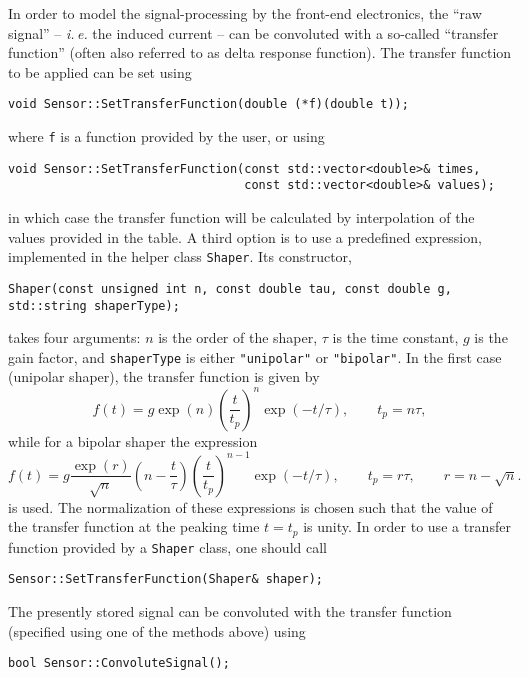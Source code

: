In order to model the signal-processing by the front-end electronics, the 
``raw signal'' -- \textit{i.\,e.} the induced current -- 
can be convoluted with a so-called ``transfer function'' (often also referred 
to as delta response function). 
The transfer function to be applied can be set using
\begin{lstlisting}
void Sensor::SetTransferFunction(double (*f)(double t));
\end{lstlisting}
where \texttt{f} is a function provided by the user, or using
\begin{lstlisting}
void Sensor::SetTransferFunction(const std::vector<double>& times,
                                 const std::vector<double>& values);
\end{lstlisting}
in which case the transfer function will be calculated by 
interpolation of the values provided in the table.
A third option is to use a predefined expression, implemented in 
the helper class \texttt{Shaper}. Its constructor,
\begin{lstlisting}
Shaper(const unsigned int n, const double tau, const double g, std::string shaperType);
\end{lstlisting}
takes four arguments: $n$ is the order of the shaper, 
$\tau$ is the time constant, $g$ is the gain factor, 
and \texttt{shaperType} is either \texttt{"unipolar"} or \texttt{"bipolar"}.
In the first case (unipolar shaper), the transfer function is given by
\begin{equation*}
  f\left(t\right) = g \exp\left(n\right)\left(\frac{t}{t_{p}}\right)^{n}
                    \exp\left(-t / \tau\right), \qquad t_{p} = n\tau,
\end{equation*} 
while for a bipolar shaper the expression
\begin{equation*}
  f\left(t\right) = g \frac{\exp\left(r\right)}{\sqrt{n}} \left(n - \frac{t}{\tau}\right)
                    \left(\frac{t}{t_{p}}\right)^{n - 1} 
                    \exp\left(-t / \tau\right), \qquad t_{p} = r\tau, \qquad r = n - \sqrt{n}.
\end{equation*}
is used. The normalization of these expressions is chosen such that the  
value of the transfer function at the peaking time $t = t_{p}$ is unity.
In order to use a transfer function provided by a \texttt{Shaper} class,
one should call
\begin{lstlisting}
Sensor::SetTransferFunction(Shaper& shaper);
\end{lstlisting}

The presently stored signal can be convoluted with the 
transfer function (specified using one of the methods above) using 
\begin{lstlisting}
bool Sensor::ConvoluteSignal();
\end{lstlisting}

